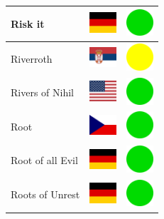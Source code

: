 \documentclass[12pt, a4paper, twoside]{report}
\begin{document}
\begin{center}
\begin{longtable}{|p{5cm}|p{2cm}|p{2cm}|}
 Risk it                                                    & \includegraphics[width=1cm]{../img/flags/de} &   \includegraphics[width=1cm]{../likes/y} \\ \hline
 Riverroth                                                  & \includegraphics[width=1cm]{../img/flags/rs} &   \includegraphics[width=1cm]{../likes/m} \\ \hline
 Rivers of Nihil                                            & \includegraphics[width=1cm]{../img/flags/us} &   \includegraphics[width=1cm]{../likes/y} \\ \hline
 Root                                                       & \includegraphics[width=1cm]{../img/flags/cz} &   \includegraphics[width=1cm]{../likes/y} \\ \hline
 Root of all Evil                                           & \includegraphics[width=1cm]{../img/flags/de} &   \includegraphics[width=1cm]{../likes/y} \\ \hline
 Roots of Unrest                                            & \includegraphics[width=1cm]{../img/flags/de} &   \includegraphics[width=1cm]{../likes/y} \\ \hline

\end{longtable}
\end{center}
\end{document}
